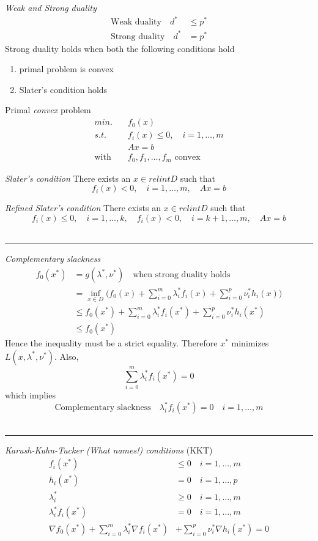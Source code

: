 \noindent
\textit{Weak and Strong duality}
\begin{align*}
  \mbox{Weak duality}  \quad d^* &\le p^* \\
  \mbox{Strong duality} \quad d^* &= p^*
\end{align*}
Strong duality holds when both the following conditions hold
\begin{enumerate}
\item primal problem is convex
\item Slater's condition holds
\end{enumerate}

Primal \textit{convex} problem
\begin{align*}
min. \quad& f_0(x)\\
s.t. \quad& f_i(x) \le 0, \quad i=1,\ldots,m\\
\quad& Ax = b\\
\mbox{with }& f_0,f_1,\ldots,f_m \mbox{ convex}
\end{align*}

\textit{Slater's condition} 
There exists an \(x \in relint D\) such that
\[f_i(x) < 0, \quad i=1,\ldots,m, \quad Ax=b\]

\textit{Refined Slater's condition} 
There exists an \(x \in relint D\) such that
\[f_i(x) \le 0, \quad i=1,\ldots,k, \quad
f_i(x) < 0, \quad i=k+1,\ldots,m, \quad Ax=b\]\\
\rule{\linewidth}{0.1mm}

\noindent
\textit{Complementary slackness}
\begin{align*}
f_0(x^*) &= g(\lambda^*,\nu^*) \quad \mbox{when strong duality holds}\\
&= \inf_{x \in D} \bigg( f_0(x) + \sum_{i=0}^m \lambda_i^* f_i(x)
 + \sum_{i=0}^p \nu_i^* h_i(x) \bigg) \\
&\le f_0(x^*) + \sum_{i=0}^m \lambda_i^* f_i(x^*)
 + \sum_{i=0}^p \nu_i^* h_i(x^*)\\
&\le f_0(x^*)
\end{align*}
Hence the inequality must be a strict equality.
Therefore \(x^*\) minimizes \(L(x,\lambda^*,\nu^*)\). Also,
\[ \sum_{i=0}^m \lambda_i^* f_i(x^*) = 0\] which implies
\[\mbox{Complementary slackness} \quad \lambda_i^* f_i(x^*) = 0 
\quad i=1,\ldots,m\]\\
\rule{\linewidth}{0.1mm}

\noindent
\textit{Karush-Kuhn-Tucker (What names!) conditions} (KKT)
\begin{align*}
f_i(x^*) &\le 0 \quad i=1,\ldots,m\\
h_i(x^*) &= 0 \quad i=1,\ldots,p\\
\lambda_i^* &\ge 0 \quad i=1,\ldots,m\\
\lambda_i^* f_i(x^*) &= 0 \quad i=1,\ldots,m\\
\nabla f_0(x^*) + \sum_{i=0}^m  \lambda_i^* \nabla f_i(x^*)
& + \sum_{i=0}^p \nu_i^* \nabla h_i(x^*) = 0
\end{align*}

